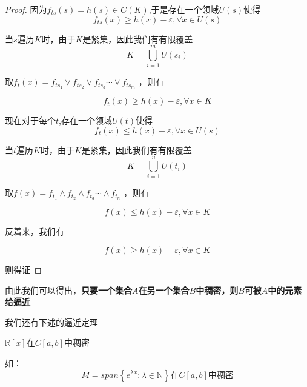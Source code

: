 \documentclass[lang=cn,10pt]{elegantbook}
\begin{document}
\begin{proof}
		因为$f_{ts}(s)=h(s)\in C(K)$,于是存在一个领域$U(s)$使得
		\begin{equation*}
			f_{ts}(x)\ge h(x)-\varepsilon,\forall x\in U(s)
		\end{equation*}
		
		当$s$遍历$K$时，由于$K$是紧集，因此我们有有限覆盖
		\begin{equation*}
			K=\bigcup_{i=1}^m{U\left( s_i \right)}
		\end{equation*}
		
		取$f_{t}\left( x \right) =f_{ts_1}\lor f_{ts_2}\lor f_{ts_3}\cdots \lor f_{ts_m}$
		，则有
		
		\begin{equation*}
			f_{t}(x)\ge h(x)-\varepsilon,\forall x\in K
		\end{equation*}
		
			现在对于每个$t$,存在一个领域$U(t)$使得
		\begin{equation*}
			f_{t}(x)\le h(x)-\varepsilon,\forall x\in U(s)
		\end{equation*}
		
		当$t$遍历$K$时，由于$K$是紧集，因此我们有有限覆盖
		\begin{equation*}
			K=\bigcup_{i=1}^n{U\left( t_i \right)}
		\end{equation*}
		
		取$f\left( x \right) =f_{t_1}\land f_{t_2}\land f_{t_3}\cdots \land f_{t_n}$
		，则有
		
		\begin{equation*}
			f(x)\le h(x)-\varepsilon,\forall x\in K
		\end{equation*}
		
		反着来，我们有
		
		\begin{equation*}
			f(x)\ge h(x)-\varepsilon,\forall x\in K
		\end{equation*}
		
		则得证
	\end{proof}
	
	由此我们可以得出，\textbf{只要一个集合$A$在另一个集合$B$中稠密，则$B$可被$A$中的元素给逼近}
	
	我们还有下述的逼近定理
	\begin{theorem}[维斯特拉斯第一定理]
		
		$\mathbb{R}[x]$在$C[a,b]$中稠密
		
		如：		
		\begin{equation*}
			M=span\left\{ e^{\lambda x}:\lambda \in \mathbb{N} \right\} \text{在}C\left[ a,b \right] \text{中稠密}
		\end{equation*}
		
	\end{theorem}
	
\end{document}
